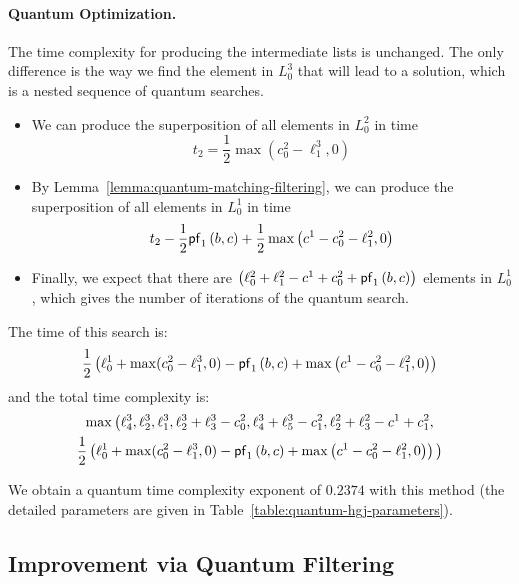 \paragraph{Quantum Optimization.}
The time complexity for producing the intermediate lists is unchanged. The only difference is the way we find the element in $L_0^3$ that will lead to a solution, which is a nested sequence of quantum searches.
\begin{itemize}
\item We can produce the superposition of all elements in $L_0^2$ in time
$$ t_{2} = \frac{1}{2} \max( c_0^2 - \ell_1^3, 0 ) $$
\item By Lemma~\ref{lemma:quantum-matching-filtering}, we can produce the superposition of all elements in $L_0^1$ in time
$$ t_2 - \frac{1}{2} \mathsf{pf}_1 \left(b, c \right) + \frac{1}{2} \max \left( c^1 - c_0^2 - \ell_1^2, 0 \right)  $$
\item Finally, we expect that there are $ \left( \ell_0^2 + \ell_1^2 - c^1 + c_0^2 + \mathsf{pf}_1 \left(b, c \right) \right)$ elements in $L_0^1$, which gives the number of iterations of the quantum search.
\end{itemize}
 The time of this search is:
$$ \frac{1}{2} \left( \ell_0^1 +  \max( c_0^2 - \ell_1^3, 0 ) - \mathsf{pf}_1 \left(b, c \right) + \max \left( c^1 - c_0^2 - \ell_1^2, 0 \right) \right)  $$
and the total time complexity is:
\begin{multline*}
\max \big( \ell_4^3, \ell_2^3, \ell_1^3, \ell_2^3 + \ell_3^3 - c_0^2, \ell_4^3 + \ell_5^3 - c_1^2, \ell_2^2 + \ell_3^2 - c^1 + c_1^2, \\
\frac{1}{2} \left( \ell_0^1 +  \max( c_0^2 - \ell_1^3, 0 ) - \mathsf{pf}_1 \left(b, c \right) + \max \left( c^1 - c_0^2 - \ell_1^2, 0 \right) \right) \big)
\end{multline*}


We obtain a quantum time complexity exponent of $0.2374$ with this method (the detailed parameters are given in Table~\ref{table:quantum-hgj-parameters}).


\subsection{Improvement via Quantum Filtering}
\label{subsection:hgj-quantum-second}

